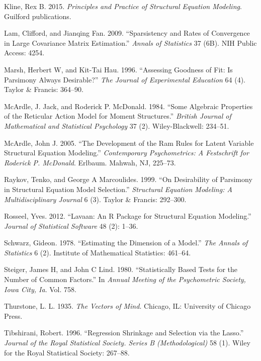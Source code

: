 \documentclass[article]{jss}
\begin{document}
\hypertarget{ref-kline2015principles}{}
Kline, Rex B. 2015. \emph{Principles and Practice of Structural Equation
Modeling}. Guilford publications.

\hypertarget{ref-lam2009sparsistency}{}
Lam, Clifford, and Jianqing Fan. 2009. ``Sparsistency and Rates of
Convergence in Large Covariance Matrix Estimation.'' \emph{Annals of
Statistics} 37 (6B). NIH Public Access: 4254.

\hypertarget{ref-marsh1996assessing}{}
Marsh, Herbert W, and Kit-Tai Hau. 1996. ``Assessing Goodness of Fit: Is
Parsimony Always Desirable?'' \emph{The Journal of Experimental
Education} 64 (4). Taylor \& Francis: 364--90.

\hypertarget{ref-McArdle_1984}{}
McArdle, J. Jack, and Roderick P. McDonald. 1984. ``Some Algebraic
Properties of the Reticular Action Model for Moment Structures.''
\emph{British Journal of Mathematical and Statistical Psychology} 37
(2). Wiley-Blackwell: 234--51.

\hypertarget{ref-mcardle2005}{}
McArdle, John J. 2005. ``The Development of the Ram Rules for Latent
Variable Structural Equation Modeling.'' \emph{Contemporary
Psychometrics: A Festschrift for Roderick P. McDonald}. Erlbaum. Mahwah,
NJ, 225--73.

\hypertarget{ref-raykov1999desirability}{}
Raykov, Tenko, and George A Marcoulides. 1999. ``On Desirability of
Parsimony in Structural Equation Model Selection.'' \emph{Structural
Equation Modeling: A Multidisciplinary Journal} 6 (3). Taylor \&
Francis: 292--300.

\hypertarget{ref-rosseel2012}{}
Rosseel, Yves. 2012. ``Lavaan: An R Package for Structural Equation
Modeling.'' \emph{Journal of Statistical Software} 48 (2): 1--36.

\hypertarget{ref-schwarz1978estimating}{}
Schwarz, Gideon. 1978. ``Estimating the Dimension of a Model.''
\emph{The Annals of Statistics} 6 (2). Institute of Mathematical
Statistics: 461--64.

\hypertarget{ref-steiger1980}{}
Steiger, James H, and John C Lind. 1980. ``Statistically Based Tests for
the Number of Common Factors.'' In \emph{Annual Meeting of the
Psychometric Society, Iowa City, Ia}. Vol. 758.

\hypertarget{ref-thurstone1937}{}
Thurstone, L. L. 1935. \emph{The Vectors of Mind}. Chicago, IL:
University of Chicago Press.

\hypertarget{ref-Tibshirani1996}{}
Tibshirani, Robert. 1996. ``Regression Shrinkage and Selection via the
Lasso.'' \emph{Journal of the Royal Statistical Society. Series B
(Methodological)} 58 (1). Wiley for the Royal Statistical Society:
267--88.
\end{document}
